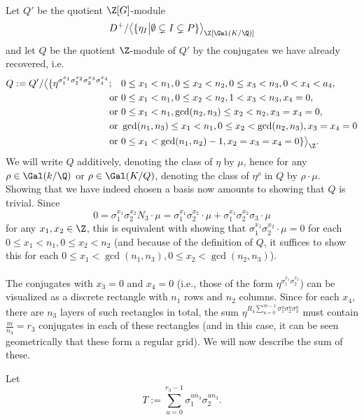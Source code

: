 \paragraph*{}
Let $Q'$ be the quotient $\Z[G]$-module $$D^+/\big\langle \{\eta_I \big\vert \emptyset \subsetneq I \subsetneq P \}\big\rangle_{\Z[\Gal(K/\Q)]}$$
and let $Q$ be the quotient $\Z$-module of $Q'$ by the conjugates we have already recovered, i.e.
\begin{align*}
Q:=Q'/\big\langle \{\eta^{\sigma_1^{x_1}\sigma_2^{x_2}\sigma_3^{x_3}\sigma_4^{x_4}}; \quad & 0\leq x_1< n_1, 0\leq x_2<n_2, 0\leq x_3<n_3,0< x_4<a_4,\\
\text { or }& 0\leq x_1< n_1, 0\leq x_2<n_2, 1< x_3<n_3,x_4=0,\\
\text { or }& 0\leq x_1< n_1, \gcd(n_2,n_3)\leq x_2<n_2, x_3=x_4=0,\\
\text { or }& \gcd(n_1,n_3)\leq x_1< n_1, 0\leq x_2<\gcd(n_2,n_3), x_3=x_4=0\\ 
\text { or }&0\leq x_1 <\gcd(n_1,n_2)-1, x_2=x_3=x_4=0 \}\big\rangle_{\Z}.
\end{align*}
We will write $Q$ additively, denoting the class of $\eta$ by $\mu$, hence for any $\rho\in\Gal(k/\Q)$ or $\rho\in \Gal(K/Q)$, denoting the class of $\eta^{\rho}$ in $Q$ by $\rho\cdot \mu$.
Showing that we have indeed chosen a basis now amounts to showing that $Q$ is trivial. Since $$0=\sigma_1^{x_1}\sigma_2^{x_2}N_3\cdot \mu=\sigma_1^{x_1}\sigma_2^{x_2}\cdot \mu+\sigma_1^{x_1}\sigma_2^{x_2}\sigma_3\cdot \mu$$
for any $x_1,x_2\in\Z$,
this is equivalent with showing that $\sigma_1^{x_1}\sigma_2^{x_2}\cdot \mu=0$ for each $0\leq x_1<n_1, 0\leq x_2<n_2$ (and because of the definition of $Q$, it suffices to show this for each $0\leq x_1<\gcd(n_1,n_3), 0\leq x_2<\gcd(n_2,n_3)$).

\paragraph*{}
The conjugates with $x_3=0$ and $x_4=0$ (i.e., those of the form $\eta^{\sigma_1^{x_1}\sigma_2^{x_2}}$) can be visualized as a discrete rectangle with $n_1$ rows and $n_2$ columns. Since for each $x_4$, there are $n_3$ layers of such rectangles in total, the sum $\eta^{R_4\sum_{u=0}^{m-1}\sigma_1^{u}\sigma_2^{u}\sigma_3^{u}}$ must contain $\frac{m}{n_3}=r_3$ conjugates in each of these rectangles (and in this case, it can be seen geometrically that these form a regular grid). We will now describe the sum of these. 

Let $$T:=\sum_{u=0}^{r_3-1}\sigma_1^{un_3}\sigma_2^{un_3}.$$

